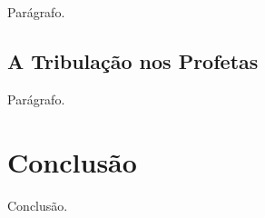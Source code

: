     Parágrafo.

\subsection{A Tribulação nos Profetas}

    Parágrafo.



\section{Conclusão}

    Conclusão.

